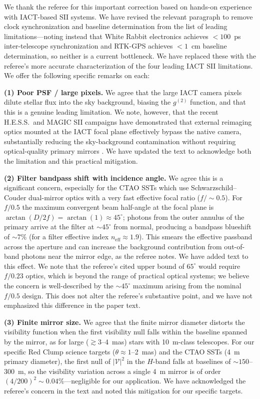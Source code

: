 \documentclass[12pt]{article}
\newcommand{\response}[1]{\noindent #1\medskip}
\begin{document}
\response{We thank the referee for this important correction based on hands-on experience
with IACT-based SII systems. We have revised the relevant paragraph to remove clock
synchronization and baseline determination from the list of leading limitations---noting
instead that White Rabbit electronics achieves $<100$~ps inter-telescope synchronization
and RTK-GPS achieves $<1$~cm baseline determination, so neither is a current bottleneck.
We have replaced these with the referee's more accurate characterization of the four
leading IACT SII limitations. We offer the following specific remarks on each:

\medskip
\noindent\textbf{(1) Poor PSF / large pixels.}
We agree that the large IACT camera pixels dilute stellar flux into the sky background,
biasing the $g^{(2)}$ function, and that this is a genuine leading limitation.
We note, however, that the recent H.E.S.S.\ and MAGIC SII campaigns have demonstrated
that external reimaging optics mounted at the IACT focal plane effectively bypass the
native camera, substantially reducing the sky-background contamination without requiring
optical-quality primary mirrors
\citep{2024MNRAS.529.4387A,2024MNRAS.52712243Z,2025MNRAS.537.2334V}.
We have updated the text to acknowledge both the limitation and this practical mitigation.

\medskip
\noindent\textbf{(2) Filter bandpass shift with incidence angle.}
We agree this is a significant concern, especially for the CTAO SSTs which use
Schwarzschild--Couder dual-mirror optics with a very fast effective focal ratio
($f/\sim 0.5$).  For $f/0.5$ the maximum convergent beam half-angle at the focal plane
is $\arctan(D/2f) = \arctan(1) \approx 45^\circ$; photons from the outer annulus of the
primary arrive at the filter at $\sim 45^\circ$ from normal, producing a bandpass blueshift
of $\sim 7\%$ (for a filter effective index $n_\mathrm{eff} \approx 1.9$).
This smears the effective passband across the aperture and can increase the background
contribution from out-of-band photons near the mirror edge, as the referee notes.
We have added text to this effect.
We note that the referee's cited upper bound of $65^\circ$ would require $f/0.23$ optics,
which is beyond the range of practical optical systems; we believe the concern is
well-described by the $\sim 45^\circ$ maximum arising from the nominal $f/0.5$ design.
This does not alter the referee's substantive point, and we have not emphasized this
difference in the paper text.

\medskip
\noindent\textbf{(3) Finite mirror size.}
We agree that the finite mirror diameter distorts the visibility function when the first
visibility null falls within the baseline spanned by the mirror, as for large
($\gtrsim 3$--4~mas) stars with 10~m-class telescopes.
For our specific Red Clump science targets ($\theta \approx 1$--2~mas) and the CTAO SSTs
(4~m primary diameter), the first null of $|\mathcal{V}|^2$ in the $H$-band falls at
baselines of $\sim 150$--300~m, so the visibility variation across a single 4~m mirror is
of order $(4/200)^2 \sim 0.04\%$---negligible for our application.
We have acknowledged the referee's concern in the text and noted this mitigation for our
specific targets.

}
\end{document}
